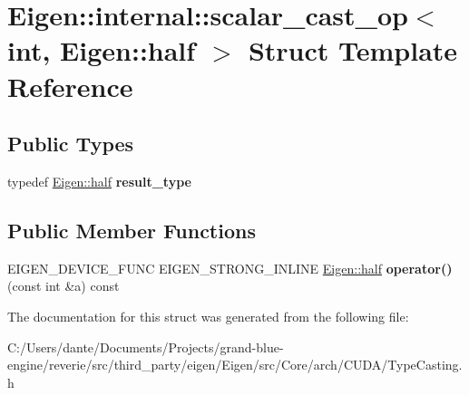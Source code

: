 \hypertarget{struct_eigen_1_1internal_1_1scalar__cast__op_3_01int_00_01_eigen_1_1half_01_4}{}\section{Eigen\+::internal\+::scalar\+\_\+cast\+\_\+op$<$ int, Eigen\+::half $>$ Struct Template Reference}
\label{struct_eigen_1_1internal_1_1scalar__cast__op_3_01int_00_01_eigen_1_1half_01_4}
\subsection*{Public Types}
\begin{DoxyCompactItemize}
\item 
\mbox{\label{struct_eigen_1_1internal_1_1scalar__cast__op_3_01int_00_01_eigen_1_1half_01_4_a3ab1f01b98ad0326ee17152f3071696e}} 
typedef \mbox{\hyperlink{struct_eigen_1_1half}{Eigen\+::half}} {\bfseries result\+\_\+type}
\end{DoxyCompactItemize}
\subsection*{Public Member Functions}
\begin{DoxyCompactItemize}
\item 
\mbox{\label{struct_eigen_1_1internal_1_1scalar__cast__op_3_01int_00_01_eigen_1_1half_01_4_a6526f3eb5bc13ebeb3c19bf764f55497}} 
E\+I\+G\+E\+N\+\_\+\+D\+E\+V\+I\+C\+E\+\_\+\+F\+U\+NC E\+I\+G\+E\+N\+\_\+\+S\+T\+R\+O\+N\+G\+\_\+\+I\+N\+L\+I\+NE \mbox{\hyperlink{struct_eigen_1_1half}{Eigen\+::half}} {\bfseries operator()} (const int \&a) const
\end{DoxyCompactItemize}


The documentation for this struct was generated from the following file\+:\begin{DoxyCompactItemize}
\item 
C\+:/\+Users/dante/\+Documents/\+Projects/grand-\/blue-\/engine/reverie/src/third\+\_\+party/eigen/\+Eigen/src/\+Core/arch/\+C\+U\+D\+A/Type\+Casting.\+h\end{DoxyCompactItemize}
